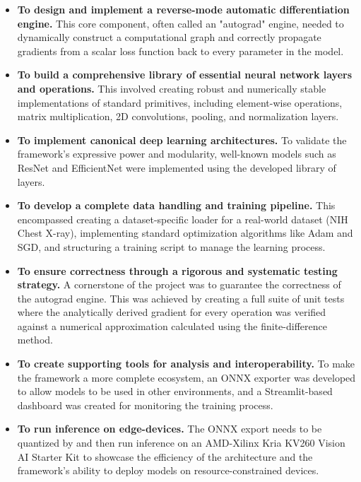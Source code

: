 \documentclass[a4paper]{article}
\begin{document}
\begin{itemize}
    \item \textbf{To design and implement a reverse-mode automatic differentiation engine.} This core component, often called an "autograd" engine, needed to dynamically construct a computational graph and correctly propagate gradients from a scalar loss function back to every parameter in the model.

    \item \textbf{To build a comprehensive library of essential neural network layers and operations.} This involved creating robust and numerically stable implementations of standard primitives, including element-wise operations, matrix multiplication, 2D convolutions, pooling, and normalization layers.

    \item \textbf{To implement canonical deep learning architectures.} To validate the framework's expressive power and modularity, well-known models such as ResNet and EfficientNet were implemented using the developed library of layers.

    \item \textbf{To develop a complete data handling and training pipeline.} This encompassed creating a dataset-specific loader for a real-world dataset (NIH Chest X-ray), implementing standard optimization algorithms like Adam and SGD, and structuring a training script to manage the learning process.

    \item \textbf{To ensure correctness through a rigorous and systematic testing strategy.} A cornerstone of the project was to guarantee the correctness of the autograd engine. This was achieved by creating a full suite of unit tests where the analytically derived gradient for every operation was verified against a numerical approximation calculated using the finite-difference method.

    \item \textbf{To create supporting tools for analysis and interoperability.} To make the framework a more complete ecosystem, an ONNX exporter was developed to allow models to be used in other environments, and a Streamlit-based dashboard was created for monitoring the training process.

    \item \textbf{To run inference on edge-devices.} The ONNX export needs to be quantized by and then run inference on an AMD-Xilinx Kria KV260 Vision AI Starter Kit to showcase the efficiency of the architecture and the framework's ability to deploy models on resource-constrained devices.
\end{itemize}
\end{document}
